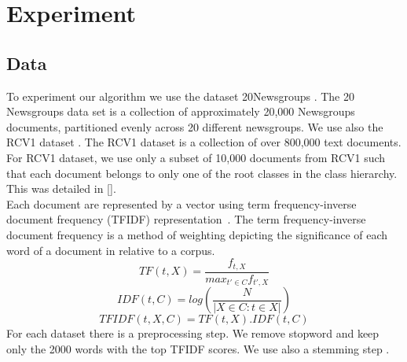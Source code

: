 \section{Experiment}\label{seq:exp}

\subsection{Data}
To experiment our algorithm we use the dataset 20Newsgroups \cite{Newsgroups20}.
The 20 Newsgroups data set is a collection of approximately 20,000 Newsgroups 
documents, partitioned evenly across 20 different newsgroups. We use also the 
RCV1 dataset \cite{Lewis:2004:RNB:1005332.1005345}. The RCV1 dataset is a 
collection of over 800,000 text documents. For RCV1 dataset, we use only a 
subset of 10,000 documents from RCV1 such that each document belongs to only 
one of the root classes in the class hierarchy. This was detailed in 
[\cite{Deap-K-Means}].\\
Each document are represented by a vector using term frequency-inverse document 
frequency (TFIDF) representation~\cite{doi:10.1108/eb026526}.
The term frequency-inverse document frequency is a method of weighting depicting 
the significance of each word of a document in relative to a corpus.
\begin{equation}
TF(t, X) = \frac{f_{t, X}}{max_{t' \in C}f_{t', X}} 
\end{equation}
\begin{equation}
IDF(t, C) = log(\frac{N}{|X \in C : t \in X|})
\end{equation}
\begin{equation}
TFIDF(t,X,C) = TF(t, X) . IDF(t, C)   
\end{equation}
For each dataset there is a preprocessing step. We remove stopword and keep only
the 2000 words with the top TFIDF scores. We use also a stemming step 
\cite{journals/mtcl/Lovins68}. 
